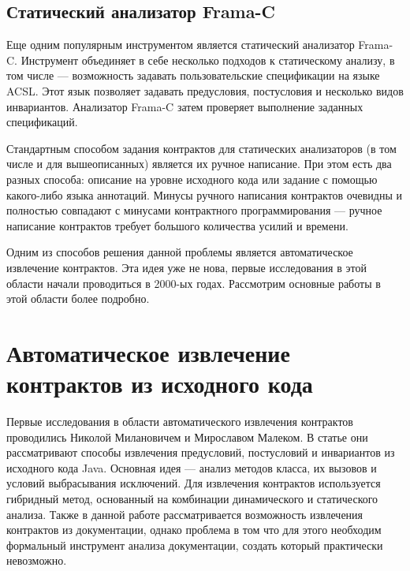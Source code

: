 \subsection{Статический анализатор Frama-C}
Еще одним популярным инструментом является статический анализатор Frama-C\cite{framaC}. Инструмент объединяет в себе несколько подходов к статическому анализу, в том числе --- возможность задавать пользовательские спецификации на языке ACSL\cite{acsl}. Этот язык позволяет задавать предусловия, постусловия и несколько видов инвариантов. Анализатор Frama-C затем проверяет выполнение заданных спецификаций.


Стандартным способом задания контрактов для статических анализаторов (в том числе и для вышеописанных) является их ручное написание. При этом есть два разных способа: описание на уровне исходного кода или задание с помощью какого-либо языка аннотаций. Минусы ручного написания контрактов очевидны и полностью совпадают с минусами контрактного программирования --- ручное написание контрактов требует большого количества усилий и времени.

Одним из способов решения данной проблемы является автоматическое извлечение контрактов. Эта идея уже не нова, первые исследования в этой области начали проводиться в 2000-ых годах. Рассмотрим основные работы в этой области более подробно.

\section{Автоматическое извлечение контрактов из исходного кода}
Первые исследования в области автоматического извлечения контрактов проводились Николой Милановичем и Мирославом Малеком. В статье  \cite{extractingContractsFromJava} они рассматривают способы извлечения предусловий, постусловий и инвариантов из исходного кода Java. Основная идея --- анализ методов класса, их вызовов и условий выбрасывания исключений. Для извлечения контрактов используется гибридный метод, основанный на комбинации динамического и статического анализа. Также в данной работе рассматривается возможность извлечения контрактов из документации, однако проблема в том что для этого необходим формальный инструмент анализа документации, создать который практически невозможно.

